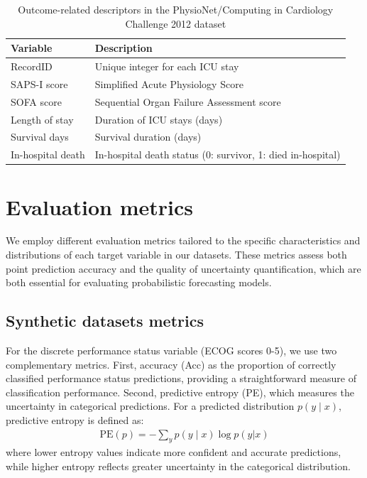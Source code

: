 \documentclass[preprint,12pt]{elsarticle}
\begin{document}
\begin{table}[h!]
    \centering
    \caption{Outcome-related descriptors in the PhysioNet/Computing in Cardiology Challenge 2012 dataset}
    \small\begin{tabularx}{\textwidth}{lX}
        \toprule
        \textbf{Variable} & \textbf{Description} \\
        \midrule
        RecordID          & Unique integer for each ICU stay \\
        SAPS-I score      & Simplified Acute Physiology Score~\citep{le1984simplified} \\
        SOFA score        & Sequential Organ Failure Assessment score~\citep{ferreira2001serial} \\
        Length of stay    & Duration of ICU stays (days) \\
        Survival days     & Survival duration (days) \\
        In-hospital death & In-hospital death status (0: survivor, 1: died in-hospital) \\
        \bottomrule
    \end{tabularx}
    \label{tab:icu_outcome_descriptors}
\end{table}

\section{Evaluation metrics}
We employ different evaluation metrics tailored to the specific characteristics and distributions of each target variable in our datasets.
These metrics assess both point prediction accuracy and the quality of uncertainty quantification, which are both essential for evaluating probabilistic forecasting models.

\subsection{Synthetic datasets metrics} 
For the discrete performance status variable (ECOG scores 0-5), we use two complementary metrics. First, accuracy (Acc) as the proportion of correctly classified performance status predictions, providing a straightforward measure of classification performance. Second, predictive entropy (PE), which measures the uncertainty in categorical predictions. For a predicted distribution $p(y \mid x)$, predictive entropy is defined as:
\begin{align}
  \text{PE}(p) = -\sum_{y} p(y \mid x) \log p(y|x)  
\end{align}
where lower entropy values indicate more confident and accurate predictions, while higher entropy reflects greater uncertainty in the categorical distribution.
\end{document}
